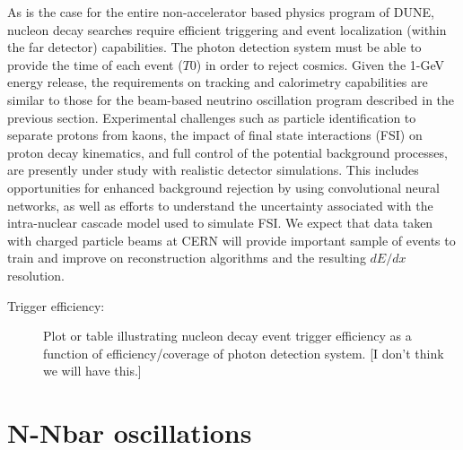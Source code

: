 As is the case for the entire non-accelerator based physics program of DUNE, nucleon decay 
searches require efficient triggering and event localization (within the far detector) 
capabilities. The photon detection system must be able to provide the time of each event ($T0$) in order to reject cosmics. Given the 1-GeV energy release, the requirements on tracking and calorimetry 
capabilities are similar to those for the beam-based neutrino oscillation program described 
in the previous section.  
Experimental challenges such as particle identification to separate protons from kaons, 
the impact of final state interactions (FSI) on proton decay kinematics, and full control 
of the potential background processes, are presently under study with realistic detector simulations.
This includes opportunities for enhanced background rejection 
by using convolutional neural networks, as well as efforts to understand the 
uncertainty associated with the intra-nuclear cascade model used to simulate FSI. 
We expect that  data taken with charged particle beams at CERN will 
provide important sample of events to train and improve on reconstruction algorithms 
and the resulting $dE/dx$ resolution.

\begin{description}
\item[Trigger efficiency:] Plot or table illustrating nucleon decay event trigger efficiency as a function of efficiency/coverage of photon detection system. [I don't think we will have this.]
\end{description}


\section{N-Nbar oscillations}
\label{sec:nonaccel-nnbar}

